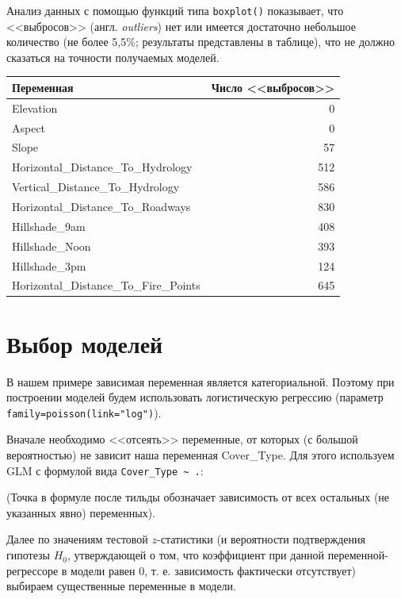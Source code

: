 \documentclass[12pt]{article}
\begin{document}
Анализ данных с помощью функций типа \verb|boxplot()| показывает, что <<выбросов>> (англ. \textit{outliers}) нет или
имеется достаточно небольшое количество (не более 5,5\%; результаты представлены в таблице),
что не должно сказаться на точности получаемых моделей.

\begin{tabular}{|l|r|}
	\hline
	Переменная                   & Число <<выбросов>> \\ \hline
	Elevation                              & 0                               \\
	Aspect                                 & 0                               \\
	Slope                                  & 57                              \\
	Horizontal\_Distance\_To\_Hydrology    & 512                             \\
	Vertical\_Distance\_To\_Hydrology      & 586                             \\
	Horizontal\_Distance\_To\_Roadways     & 830                             \\
	Hillshade\_9am                         & 408                             \\
	Hillshade\_Noon                        & 393                             \\
	Hillshade\_3pm                         & 124                             \\
	Horizontal\_Distance\_To\_Fire\_Points & 645                             \\ \hline
\end{tabular}

\section{Выбор моделей}
В нашем примере зависимая переменная является категориальной. Поэтому при построении моделей будем использовать логистическую
регрессию (параметр \verb|family=poisson(link="log")|).

Вначале необходимо <<отсеять>> переменные, от которых (с большой вероятностью) не зависит наша переменная Cover\_Type. Для этого
используем GLM с формулой вида \verb|Cover_Type ~ .|:

(Точка в формуле после тильды обозначает зависимость от всех остальных (не указанных явно) переменных).

Далее по значениям тестовой $z$-статистики (и вероятности подтверждения гипотезы $H_0$, утверждающей о том, что коэффициент при
данной переменной-регрессоре в модели равен 0, т. е. зависимость фактически отсутствует) выбираем существенные переменные в модели.
\end{document}
